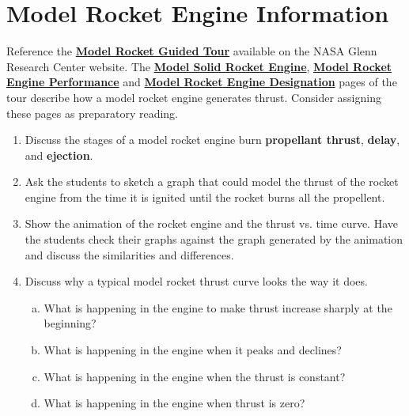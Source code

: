 \documentclass [12pt, letterpaper, titlepage] {article}
\begin{document}
\section*{Model Rocket Engine Information}
Reference the \href{https://www.grc.nasa.gov/www/k-12/rocket/rktsafe.html}{\textbf{Model Rocket Guided Tour}} available on the NASA Glenn Research Center website. The \href{https://www.grc.nasa.gov/www/k-12/rocket/rktengine.html}{\textbf{Model Solid Rocket Engine}}, \href{https://www.grc.nasa.gov/www/k-12/rocket/rktengperf.html}{\textbf{Model Rocket Engine Performance}} and \href{https://www.grc.nasa.gov/www/k-12/rocket/rktenglab.html}{\textbf{Model Rocket Engine Designation}} pages of the tour describe how a model rocket engine generates thrust. Consider assigning these pages as preparatory reading. 
	\begin{enumerate}
		\item{Discuss the stages of a model rocket engine burn \textbf{propellant thrust}, \textbf{delay}, and \textbf{ejection}.}
		\item{Ask the students to sketch a graph that could model the thrust of the rocket engine from the time it is ignited until the rocket burns all the propellent.}
                 \item{Show the animation of the rocket engine and the thrust vs. time curve. Have the students check their graphs against the graph generated by the animation and discuss the similarities and differences.}
                 \item{Discuss why a typical model rocket thrust curve looks the way it does.
                 \begin{enumerate}[a.]
                 	\item{What is happening in the engine to make thrust increase sharply at the beginning?}
                 	\item{What is happening in the engine when it peaks and declines?}
                 	\item{What is happening in the engine when the thrust is constant?}
                 	\item{What is happening in the engine when thrust is zero?}
		\end{enumerate}
		}	
	\end{enumerate}
\end{document}
